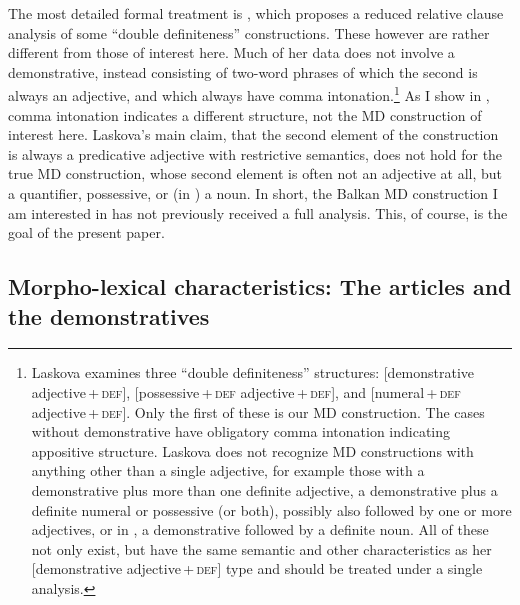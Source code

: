 \documentclass[output=paper]{langscibook}
\begin{document}
The most detailed formal treatment is \citet{Laskova2006}, which proposes a reduced relative clause analysis of some  ``double definiteness'' constructions. These however are rather different from those of interest here. Much of her data does not involve a demonstrative, instead consisting of two-word phrases of which the second is always an adjective, and which always have comma intonation.\footnote{Laskova examines three ``double definiteness'' structures: [demonstrative adjective\,+\,\textsc{def}], [possessive\,+\,\textsc{def} adjective\,+\,\textsc{def}], and [numeral\,+\,\textsc{def} adjective\,+\,\textsc{def}]. Only the first of these is our MD construction. The cases without demonstrative have obligatory comma intonation indicating appositive structure. Laskova does not recognize MD constructions with anything other than a single adjective, for example those with a demonstrative plus more than one definite adjective, a demonstrative plus a definite numeral or possessive (or both), possibly also followed by one or more adjectives, or in , a demonstrative followed by a definite noun. All of these not only exist, but have the same semantic and other characteristics as her [demonstrative adjective\,+\,\textsc{def}] type and should be treated under a single analysis.} As I show in , comma intonation indicates a different structure, not the MD construction of interest here. Laskova's main claim, that the second element of the construction is always a predicative adjective with restrictive semantics, does not hold for the true MD construction, whose second element is often not an adjective at all, but a quantifier, possessive, or (in ) a noun. In short, the Balkan  MD construction I am interested in has not previously received a full analysis. This, of course, is the goal of the present paper.


\subsection{Morpho-lexical characteristics: The articles and the demonstratives}\label{morphological}
\end{document}
